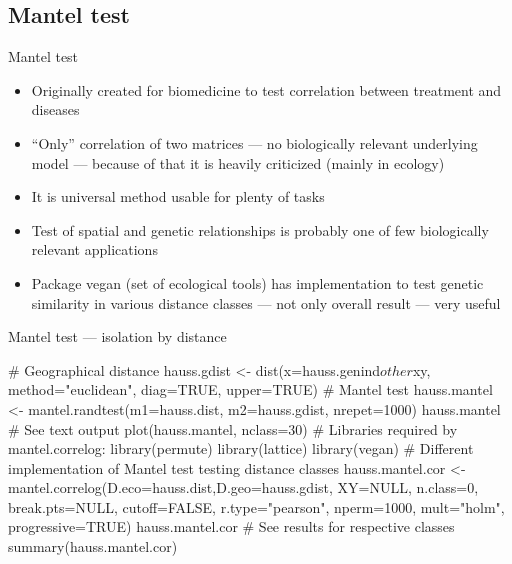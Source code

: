 \documentclass[compress, ucs, xelatex, 11pt, xcolor=svgnames, aspectratio=169,
	hyperref={
		bookmarks=true,
		unicode=true,
		colorlinks=true,
		pdftitle={Molecular data in R},
		plainpages=false,
		pdfauthor={Vojtech Zeisek},
		pdfsubject={Course about phylogeny and evolution in R},
		pdfcreator={XeLaTeX},
		pdfkeywords={R, evolution, phylogeny, molecular data},
		linkcolor=Crimson, %
		anchorcolor=Magenta, %
		citecolor=Magenta, %
		filecolor=Magenta, %
		menucolor=Magenta, %
		urlcolor=DodgerBlue, %
		pdftex},
	url={hyphens, lowtilde} %
	]{beamer}
\begin{document}
\subsection{Mantel test}

\begin{frame}{Mantel test}
	\begin{itemize}
		\item Originally created for biomedicine to test correlation between treatment and diseases
		\item \enquote{Only} correlation of two matrices --- no biologically relevant underlying model --- because of that it is heavily criticized (mainly in ecology)
		\item It is universal method usable for plenty of tasks
		\item Test of spatial and genetic relationships is probably one of few biologically relevant applications
		\item Package vegan (set of ecological tools) has implementation to test genetic similarity in various distance classes --- not only overall result --- very useful
	\end{itemize}
\end{frame}

\begin{frame}[fragile]{Mantel test --- isolation by distance}
	\begin{spluscode}
    # Geographical distance
    hauss.gdist <- dist(x=hauss.genind$other$xy, method="euclidean", diag=TRUE,
      upper=TRUE)
    # Mantel test
    hauss.mantel <- mantel.randtest(m1=hauss.dist, m2=hauss.gdist, nrepet=1000)
    hauss.mantel # See text output
    plot(hauss.mantel, nclass=30)
    # Libraries required by mantel.correlog:
    library(permute)
    library(lattice)
    library(vegan)
    # Different implementation of Mantel test testing distance classes
    hauss.mantel.cor <- mantel.correlog(D.eco=hauss.dist,D.geo=hauss.gdist,
      XY=NULL, n.class=0, break.pts=NULL, cutoff=FALSE, r.type="pearson",
      nperm=1000, mult="holm", progressive=TRUE)
    hauss.mantel.cor # See results for respective classes
    summary(hauss.mantel.cor)
	\end{spluscode}
\end{frame}
\end{document}
